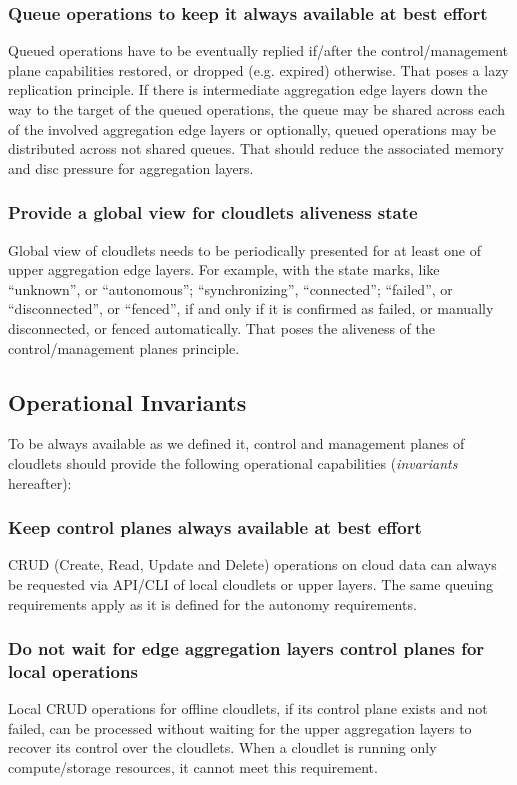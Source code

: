 \documentclass[conference]{IEEEtran}
\begin{document}
\subsubsection{Queue operations to keep it always available at best
effort}
Queued operations have to be eventually replied if/after the control/management
plane capabilities restored, or dropped (e.g. expired) otherwise. That poses a
lazy replication principle. If there is intermediate aggregation edge layers
down the way to the target of the queued operations, the queue may be shared
across each of the involved aggregation edge layers or optionally,
queued operations may be distributed across not shared queues. That should
reduce the associated memory and disc pressure for aggregation layers.

\subsubsection{Provide a global view for cloudlets aliveness state}
Global view of cloudlets needs to be periodically presented for at least one of
upper aggregation edge layers. For example, with
the state marks, like ``unknown'', or ``autonomous''; ``synchronizing'',
``connected''; ``failed'', or ``disconnected'', or ``fenced'', if and only if
it is confirmed as failed, or manually disconnected, or fenced automatically.
That poses the aliveness of the control/management planes principle.

\subsection{Operational Invariants}
To be always available as we defined it, control and management planes of
cloudlets should provide the following operational capabilities
(\textit{invariants} hereafter):

\subsubsection{Keep control planes always available at best effort}
CRUD (Create, Read, Update and Delete) operations on cloud data can always be
requested via API/CLI of local cloudlets or upper layers. The same queuing
requirements apply as it is defined for the autonomy requirements.

\subsubsection{Do not wait for edge aggregation layers control planes for local
operations}
Local CRUD operations for offline cloudlets, if its control plane exists and
not failed, can be processed without waiting for the upper aggregation layers
to recover its control over the cloudlets. When a cloudlet is running only
compute/storage resources, it cannot meet this requirement.
\end{document}

